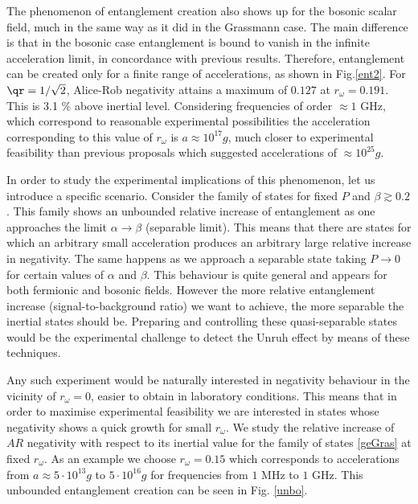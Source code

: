 The phenomenon of entanglement creation also shows up for the bosonic scalar field, much in the same way as it did in the Grassmann case. The main difference is that  in the bosonic case entanglement is bound to vanish in the infinite acceleration limit, in concordance with previous results. Therefore, entanglement can be created only for a finite range of accelerations, as shown in Fig.\ref{ent2}. For $\qr=1/\sqrt{2}$, Alice-Rob negativity attains a maximum of $0.127$ at $r_\omega=0.191$. This is  3.1 \% above inertial level. Considering frequencies of order $\approx 1$  GHz, which correspond to reasonable experimental possibilities \cite{Adessada} the acceleration corresponding to this value of $r_\omega$ is $a\approx 10^{17}g$, much closer to experimental feasibility than previous proposals \cite{ChenTaj} which suggested accelerations of $\approx 10^{25}g$.


In order to study the experimental implications of this phenomenon, let us introduce a specific scenario. Consider the family of states  for fixed $P$ and $\beta \gtrsim 0.2$. This family shows an unbounded relative increase of entanglement  as one approaches the limit $\alpha\rightarrow \beta$ (separable limit). This means that  there are states for which an arbitrary small acceleration produces an arbitrary large relative increase in negativity. The same happens as  we approach a separable state taking $P\rightarrow0$ for certain values of $\alpha$ and $\beta$. This behaviour is quite general and appears for both fermionic and bosonic fields. However the more relative entanglement increase (signal-to-background ratio) we want to achieve, the more separable the inertial states should be. Preparing and controlling these quasi-separable states would be the experimental challenge to detect the Unruh effect by means of these techniques.

Any such experiment would be naturally interested in negativity behaviour in the vicinity of $r_\omega=0$, easier to obtain in laboratory conditions. This means that in order to maximise experimental feasibility we are interested in states whose negativity shows a quick growth for small $r_\omega$. We study the relative increase of $AR$ negativity with respect to its inertial value for the family of states \eqref{geGras} at fixed $r_\omega$. As an example we choose  $r_\omega=0.15$ which corresponds to accelerations from $a\approx 5\cdot10^{13}g $ to $5\cdot10^{16} g$ for frequencies from $1 \text{ MHz}$ to $1 \text{ GHz}$. This unbounded entanglement creation can be seen in Fig. \ref{unbo}.

